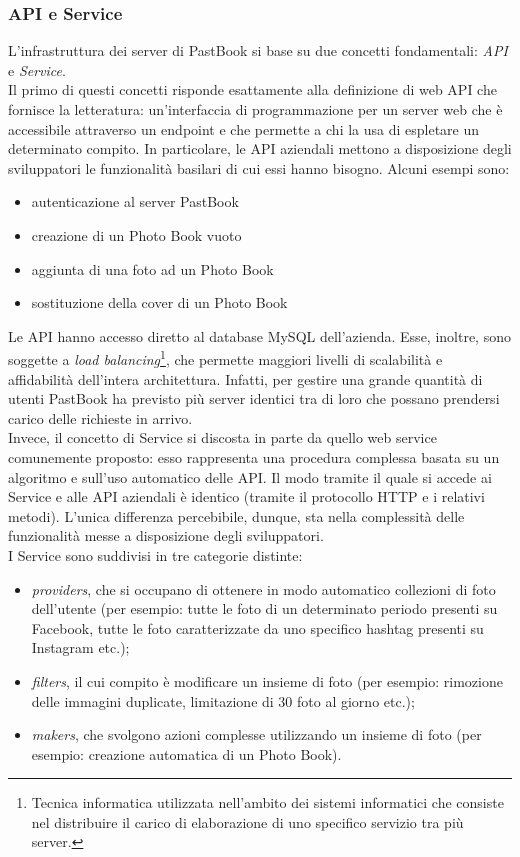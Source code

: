 			\subsubsection{API e Service}
				L'infrastruttura dei server di PastBook si base su due concetti fondamentali: \emph{API} e \emph{Service}.\\
				Il primo di questi concetti risponde esattamente alla definizione di web API che fornisce la letteratura:
				un'interfaccia di programmazione per un server web che è accessibile attraverso un endpoint e che permette a chi la
				usa di espletare un determinato compito. In particolare, le API aziendali mettono a disposizione degli sviluppatori
				le funzionalità basilari di cui essi hanno bisogno. Alcuni esempi sono:
				\begin{itemize}
					\item autenticazione al server PastBook
					\item creazione di un Photo Book vuoto
					\item aggiunta di una foto ad un Photo Book
					\item sostituzione della cover di un Photo Book
				\end{itemize}
				Le API hanno accesso diretto al database MySQL dell'azienda. Esse, inoltre, sono soggette a
				\emph{load balancing}\footnote{Tecnica informatica utilizzata nell'ambito dei sistemi informatici che consiste nel distribuire il carico di elaborazione di uno specifico
servizio tra più server.}, che permette maggiori livelli di scalabilità e
				affidabilità dell'intera architettura. Infatti, per gestire una grande quantità di utenti PastBook ha previsto più
				server identici tra di loro che possano prendersi carico delle richieste in arrivo.\\
				Invece, il concetto di Service si discosta in parte da quello web service comunemente proposto: esso rappresenta
				una procedura complessa basata su un algoritmo e sull'uso automatico delle API. Il modo tramite il quale si accede ai
				Service e alle API aziendali è identico (tramite il protocollo HTTP e i relativi metodi). L'unica differenza
				percebibile, dunque, sta nella complessità delle funzionalità messe a disposizione degli sviluppatori.\\
				I Service sono suddivisi in tre categorie distinte:
				\begin{itemize}
					\item \emph{providers}, che si occupano di ottenere in modo automatico collezioni di foto dell'utente (per
					esempio: tutte le foto di un determinato periodo presenti su Facebook, tutte le foto caratterizzate da uno
					specifico hashtag presenti su Instagram etc.);
					\item \emph{filters}, il cui compito è modificare un insieme di foto (per esempio: rimozione delle
					immagini duplicate, limitazione di 30 foto al giorno etc.);
					\item \emph{makers}, che svolgono azioni complesse utilizzando un insieme di foto (per esempio: creazione
					automatica di un Photo Book).
				\end{itemize}
				
